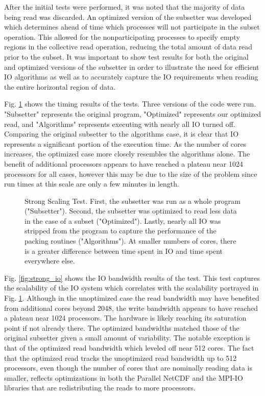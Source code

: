After the initial tests were performed, it was noted that the majority of data
being read was discarded.  An optimized version of the subsetter was developed
which determines ahead of time which processes will not participate in the
subset operation.  This allowed for the nonparticipating processes to specify
empty regions in the collective read operation, reducing the total amount of
data read prior to the subset.  It was important to show test results for both
the original and optimized versions of the subsetter in order to illustrate
the need for efficient IO algorithms as well as to accurately capture the IO
requirements when reading the entire horizontal region of data.

Fig. \ref{fig:strong} shows the timing results of the tests.  Three versions
of the code were run.  "Subsetter" represents the original program,
"Optimized" represents our optimized read, and "Algorithms" represents
executing with nearly all IO turned off.  Comparing the original subsetter to
the algorithms case, it is clear that IO represents a significant portion of the
execution time.  As the number of cores increases, the optimized case more
closely resembles the algorithms alone.  The benefit of additional processors
appears to have reached a plateau near 1024 processors for all cases, however
this may be due to the size of the problem since run times at this scale are
only a few minutes in length.

\begin{figure}[!t]
\center
\resizebox{3.5in}{!}{

}
\caption{Strong Scaling Test.  First, the subsetter was run as a whole
program ("Subsetter").  Second, the subsetter was optimized to read less data
in the case of a subset ("Optimized").  Lastly, nearly all IO was stripped
from the program to capture the performance of the packing routines
("Algorithms").  At smaller numbers of cores, there is a greater difference
between time spent in IO and time spent everywhere else.}
\label{fig:strong}
\end{figure}

Fig. \ref{fig:strong_io} shows the IO bandwidth results of the test.  This
test captures the scalability of the IO system which correlates with the
scalability portrayed in Fig. \ref{fig:strong}.  Although in the unoptimized
case the read bandwidth may have benefited from additional cores beyond 2048,
the write bandwidth appears to have reached a plateau near 1024 processors.
The hardware is likely reaching its saturation point if not already there.
The optimized bandwidths matched those of the original subsetter given a small
amount of variability.  The notable exception is that of the optimized read
bandwidth which leveled off near 512 cores. The fact that the optimized read
tracks the unoptimized read bandwidth up to 512 processors, even though the
number of cores that are nominally reading data is smaller, reflects
optimizations in both the Parallel NetCDF and the MPI-IO libraries that are
redistributing the reads to more processors.

